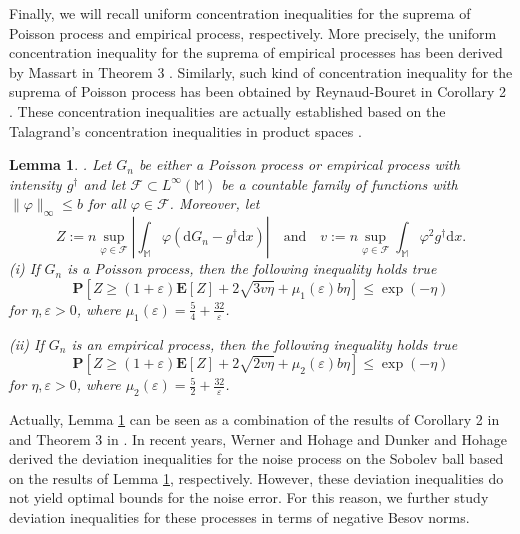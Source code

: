 \documentclass[10pt]{iopart}
\newtheorem{lemma}[theorem]{Lemma}
\begin{document}
Finally, we will recall uniform concentration inequalities for the suprema of Poisson process and empirical process, respectively. More precisely,  the uniform concentration inequality for 
the suprema of empirical processes has been derived by Massart in Theorem 3 \cite{Massart2000}. Similarly, such kind of concentration inequality for the suprema of Poisson process has been obtained by Reynaud-Bouret in
Corollary 2 \cite{ReynaudBouret2003} . These concentration inequalities are actually established based on the Talagrand's concentration inequalities in product spaces \cite{Talagrand1996}.  

\begin{lemma}\label{Lemma-2.1}. Let $G_{n}$ be either a Poisson process or empirical process
with intensity $g^{\dagger}$ and let $\mathcal{F}\subset L^{\infty}(\mathbb{M})$ be
a countable family of functions with $\|\varphi\|_{\infty}\leq b$ for all $\varphi\in\mathcal{F}$. Moreover, let 
\begin{equation}\label{8}
Z:=n\sup_{\varphi\in\mathcal{F}}\left|\int_{\mathbb{M}}\varphi(\mathrm{d}G_{n}-g^{\dagger}\mathrm{d}x)\right| \quad \mbox{and}\quad 
v:=n\sup_{\varphi\in\mathcal{F}}\int_{\mathbb{M}}\varphi^{2}g^{\dagger}\mathrm{d}x.
\end{equation}
(i) If $G_{n}$ is a Poisson process, then the following inequality holds true 
\begin{equation}\label{9}
\mathbf{P}\left[Z\geq (1+\varepsilon)\mathbf{E}[Z]+2\sqrt{3v\eta}+\mu_{1}(\varepsilon)b\eta\right]\leq \exp(-\eta)
\end{equation}
for  $\eta, \varepsilon>0$, where $\mu_{1}(\varepsilon)=\frac{5}{4}+\frac{32}{\varepsilon}$.

\hspace{-0.8cm} (ii) If $G_{n}$ is an empirical process, then the following inequality holds true
\begin{equation}\label{10}
\mathbf{P}\left[Z\geq (1+\varepsilon)\mathbf{E}[Z]+2\sqrt{2v\eta}+\mu_{2}(\varepsilon)b\eta\right]\leq \exp(-\eta)
\end{equation}
for  $\eta, \varepsilon>0$, where $\mu_{2}(\varepsilon)=\frac{5}{2}+\frac{32}{\varepsilon}$.
\end{lemma}

Actually, Lemma \ref{Lemma-2.1} can be seen as a combination of the results of Corollary 2 in \cite{ReynaudBouret2003} and Theorem 3 in 
\cite{Talagrand1996}. In recent years, Werner and Hohage \cite {Werner2012} and Dunker and Hohage \cite{Dunker2014} derived the deviation 
inequalities for the noise process on the Sobolev ball based on the results of Lemma \ref{Lemma-2.1}, respectively. 
However, these deviation inequalities do not yield optimal bounds for the noise error. For this reason, we further study deviation inequalities for these
processes in terms of negative Besov norms.
\end{document}
